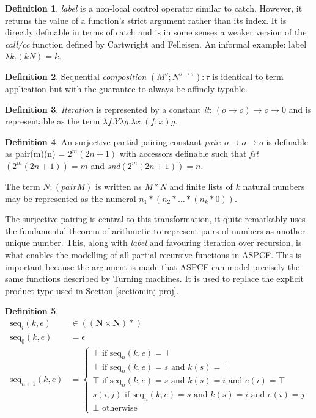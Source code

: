 \documentclass[12pt,a4paper]{report}
\theoremstyle{definition}
\theoremstyle{definition}
\newtheorem{definition}{Definition}[chapter]%
\theoremstyle{remark}
\begin{document}
\begin{definition}
    \emph{label} is a non-local control operator similar to catch. However, it returns the value of a function's strict argument rather than its index. It is directly definable in terms of catch and is in some senses a weaker version of the \emph{call/cc} function defined by Cartwright and Felleisen. An informal example: label $\lambda k.(k N) = k$.
\end{definition}
\begin{definition}
    Sequential \emph{composition} $(M^o; N^{o \rightarrow \tau}): \tau$ is identical to term application but with the guarantee to always be affinely typable.
\end{definition}
\begin{definition}
    \emph{Iteration} is represented by a constant \emph{it}: $(o \rightarrow o) \rightarrow o \rightarrow \underline{0}$ and is representable as the term $\lambda f. Y \lambda g. \lambda x. (f;x)g$.
\end{definition}
\begin{definition}
    An surjective partial pairing constant \emph{pair}: $o \rightarrow o \rightarrow o$ is definable as pair(m)(n) = $2^m(2n + 1)$ with accessors definable such that \emph{fst}$(2^m(2n + 1)) = m$ and \emph{snd}$(2^m(2n + 1)) = n$.

    The term $N; (pair M)$ is written as $M * N$ and finite lists of $k$ natural numbers may be represented as the numeral $n_1 * (n_2 * \dots * (n_k * 0))$.
\end{definition}

The surjective pairing is central to this transformation, it quite remarkably uses the fundamental theorem of arithmetic to represent pairs of numbers as another unique number. This, along with \emph{label} and favouring iteration over recursion, is what enables the modelling of all partial recursive functions in ASPCF. This is important because the argument is made that ASPCF can model precisely the same functions described by Turning machines. It is used to replace the explicit product type used in Section \ref{section:inj-proj}.

\begin{definition}
\[
\begin{split}
    \text{seq}_i(k, e)& \in ((\mathbf{N} \times \mathbf{N})*)\\
    \text{seq}_0(k, e)& = \epsilon \\
    \text{seq}_{n+1}(k, e)& = 
    \begin{cases}
        \top \text{ if seq}_n(k,e) = \top\\
        \top \text{ if seq}_n(k,e) = s \text{ and }k(s) = \top\\
        \top \text{ if seq}_n(k,e) = s \text{ and }k(s) = i \text{ and } e(i) = \top\\
        s(i, j) \text{ if seq}_n(k,e) = s \text{ and }k(s) = i \text{ and } e(i) = j\\
        \bot \text{ otherwise }
    \end{cases}
\end{split}
\]
\end{definition}
\end{document}
